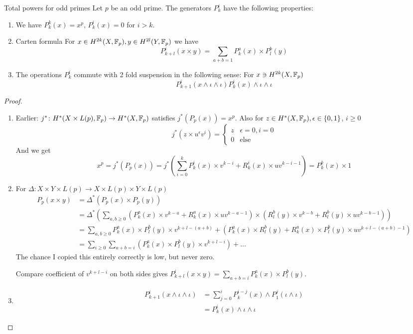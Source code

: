 \documentclass[language=english]{TemplateLecture}
\begin{document}
\begin{thm}{Total powers for odd primes}{}
    Let \(p\) be an odd prime. The generators \(P_k^i\) have the following properties:
    \begin{enumerate}
        \item We have \(P_k^k(x) = x^p\), \(P_k^i(x) = 0\) for \(i > k\).
        \item Carten formula For \(x\in H^{2k}(X,\mathbb{F}_p), y \in H^{2l}(Y, \mathbb{F}_p)\) we have
        \[P_{k+l}^i(x\times y) = \sum_{a+b = 1} P_k^a(x)\times P_l^b(y)\]
        \item The operations \(P_k^i\) commute with 2 fold suspension in the following sense: For \(x\ni H^{2k}(X,\mathbb{F}_p)\)
        \[P_{k+1}^i(x\wedge \iota\wedge \iota) P_k^i(x)\wedge \iota\wedge \iota\]
    \end{enumerate}
\end{thm}

\begin{proof}
    \begin{enumerate}
        \item Earlier: \(j^*\colon H^*(X\times L(p), \mathbb{F}_p)\to H^*(X,\mathbb{F}_p)\) satisfies \(j^*(P_p(x)) = x^p\). Also for \(z\in H^*(X,\mathbb{F}_p), \epsilon\in \{0,1\}\), \(i\geq 0\)
        \[j^*(z\times u^\epsilon v^i) = \begin{cases}
            z& \epsilon = 0, i = 0 \\
            0 & \text{else}
        \end{cases}\]
        And we get
        \[x^p = j^*(P_p(x)) = j^*(\sum_{i = 0}^k P_k^i(x)\times v^{k-i}+ R_k^i(x)\times u v^{k-i-1}) = P_k^k(x)\times 1\]
        \item For \(\Delta\colon X\times Y\times L(p)\to X\times L(p)\times Y\times L(p)\)
        \[\begin{split}
            P_p(x\times y) &=\Delta^*( P_p(x)\times P_p(y)) \\
            &= \Delta^*(\sum_{a,b\geq 0} (P_k^a(x)\times v^{k-a} + R_k^a(x)\times uv^{k-a-1})\times (R_l^b(y)\times v^{k-b} + R_l^b(y)\times uv^{k-b-1})) \\
            &= \sum_{a,b\geq 0} P_k^a(x)\times P_l^b(y)\times v^{k+l-(a+b)} + (P_k^a(x)\times R_l^b(y)+ R_k^a(x)\times P_l^b(y)\times uv^{k+l-(a+b)-1})\\
            &= \sum_{i\geq 0}\sum_{a+b = i} (P_k^a(x)\times P_l^b(y)\times v^{k+l-i}) + \dots 
        \end{split}\]
        The chance I copied this entirely correctly is low, but never zero.

        Compare coefficient of \(v^{k+l-i}\) on both sides gives \(P_{k+l}^i(x\times y) = \sum_{a+b = i} P_k^a(x) \times P_l^b(y)\).
        \item
        \[\begin{split}
            P_{k+1}^i(x\wedge \iota\wedge \iota) &= \sum_{j = 0}^iP_k^{i-j}(x)\wedge P_1^j(\iota\wedge \iota) \\
            &= P_k^i(x)\wedge \iota\wedge \iota 
        \end{split}\]\qedhere
    \end{enumerate}
\end{proof}
\end{document}
